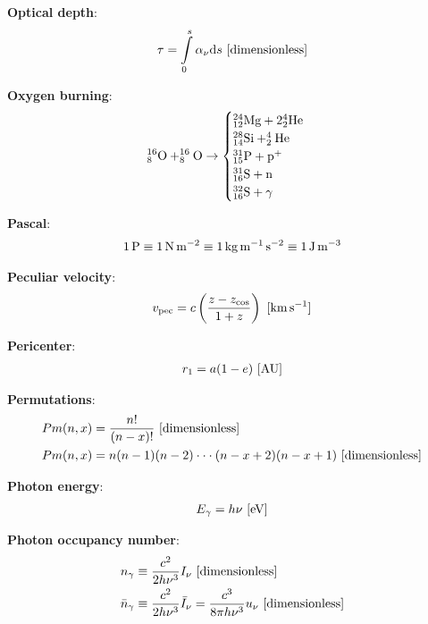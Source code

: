 \documentclass[a4paper,10pt]{article}
\begin{document}
{\noindent}\textbf{Optical depth}:
\begin{align*}
    \tau = \int\limits_0^s \alpha_\nu\mathrm{d}s ~ [{\rm dimensionless}]
\end{align*}

{\noindent}\textbf{Oxygen burning}:
\begin{equation*}
^{16}_8{\rm O} + ^{16}_8{\rm O} \rightarrow 
\begin{cases}
    {\rm ^{24}_{12}Mg + 2^4_2He} \\
    {\rm ^{28}_{14}Si + ^4_2He} \\
    {\rm ^{31}_{15}P + p^+} \\
    {\rm ^{31}_{16}S + n} \\
    {\rm ^{32}_{16}S + \gamma}
\end{cases}
\end{equation*}

{\noindent}\textbf{Pascal}:
\begin{align*}
    {\rm 1\,P \equiv 1\,N\,m^{-2} \equiv 1\,kg\,m^{-1}\,s^{-2} \equiv 1\,J\,m^{-3}}
\end{align*}

{\noindent}\textbf{Peculiar velocity}:
\begin{align*}
    v_{\rm pec} = c\left(\frac{z-z_\mathrm{cos}}{1+z}\right) ~ [{\rm km\,s^{-1}}]
\end{align*}

{\noindent}\textbf{Pericenter}:
\begin{align*}
    r_1 = a(1-e) ~ [{\rm AU}]
\end{align*}

{\noindent}\textbf{Permutations}:
\begin{align*}
    Pm(n,x) &= \frac{n!}{(n-x)!} ~ [{\rm dimensionless}] \\
    Pm(n,x) &= n(n-1)(n-2) \cdot\cdot\cdot (n-x+2)(n-x+1) ~ [{\rm dimensionless}]
\end{align*}

{\noindent}\textbf{Photon energy}:
\begin{align*}
    E_\gamma = h\nu ~ [{\rm eV}]
\end{align*}

{\noindent}\textbf{Photon occupancy number}:
\begin{align*}
    n_\gamma &\equiv \frac{c^2}{2h\nu^3} I_\nu ~ [{\rm dimensionless}] \\
    \bar{n}_\gamma &\equiv \frac{c^2}{2h\nu^3} \bar{I}_\nu = \frac{c^3}{8\pi h\nu^3} u_\nu ~ [{\rm dimensionless}]
\end{align*}
\end{document}
